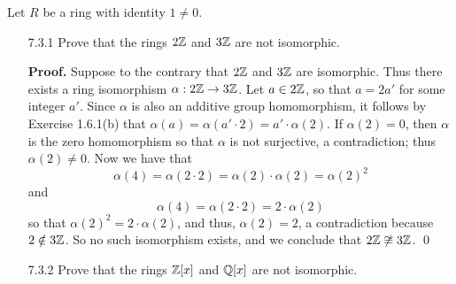 Let $R$ be a ring with identity $1 \neq 0$.


\begin{enumerate}
   \item[7.3.1]   Prove that the rings $2\mathbb{Z}$ and $3\mathbb{Z}$ are not isomorphic.

      \textbf{Proof.} Suppose to the contrary that $2\mathbb{Z}$ and $3\mathbb{Z}$ are
      isomorphic. Thus there exists a ring isomorphism
      $\alpha : 2\mathbb{Z} \rightarrow 3\mathbb{Z}$. Let $a \in 2\mathbb{Z}$, so that $a = 2a'$ for
      some integer $a'$. Since $\alpha$ is also an additive group homomorphism,
      it follows by Exercise 1.6.1(b) that
      $\alpha(a) = \alpha(a' \cdot 2) = a' \cdot \alpha(2)$. If $\alpha(2) = 0$,
      then $\alpha$ is the zero homomorphism so that $\alpha$ is not surjective,
      a contradiction; thus $\alpha(2) \neq 0$. Now we have that
      $$\alpha(4) = \alpha(2 \cdot 2) = \alpha(2) \cdot
        \alpha(2) = \alpha(2)^2$$
      and
      $$\alpha(4) = \alpha(2 \cdot 2) = 2 \cdot \alpha(2)$$
      so that $\alpha(2)^2 = 2\cdot\alpha(2)$, and thus, $\alpha(2) = 2$, a
      contradiction because $2 \notin 3\mathbb{Z}$. So no such isomorphism exists, and
      we conclude that $2\mathbb{Z} \not\cong 3\mathbb{Z}$. \qed
   \item[7.3.2]   Prove that the rings $\mathbb{Z}[x]$ and $\mathbb{Q}[x]$ are not isomorphic.


\end{enumerate}
